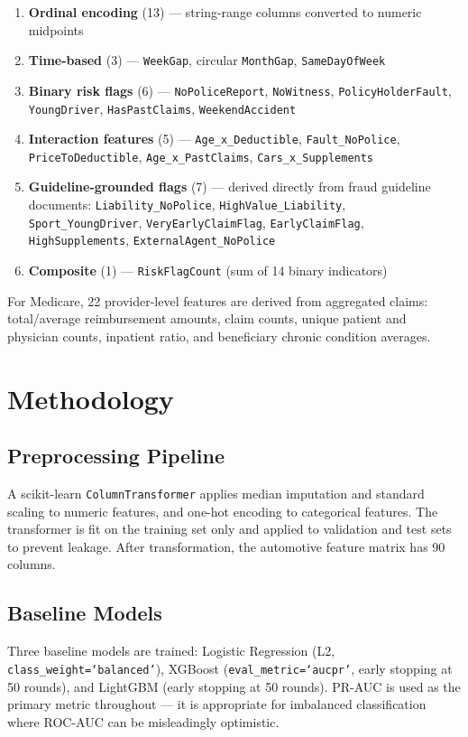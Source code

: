 \documentclass[10pt,twocolumn]{article}
\begin{document}
\begin{enumerate}[leftmargin=*, itemsep=1pt]
    \item \textbf{Ordinal encoding} (13) --- string-range columns converted to numeric midpoints
    \item \textbf{Time-based} (3) --- \texttt{WeekGap}, circular \texttt{MonthGap}, \texttt{SameDayOfWeek}
    \item \textbf{Binary risk flags} (6) --- \texttt{NoPoliceReport}, \texttt{NoWitness}, \texttt{PolicyHolderFault}, \texttt{YoungDriver}, \texttt{HasPastClaims}, \texttt{WeekendAccident}
    \item \textbf{Interaction features} (5) --- \texttt{Age\_x\_Deductible}, \texttt{Fault\_NoPolice}, \texttt{PriceToDeductible}, \texttt{Age\_x\_PastClaims}, \texttt{Cars\_x\_Supplements}
    \item \textbf{Guideline-grounded flags} (7) --- derived directly from fraud guideline documents: \texttt{Liability\_NoPolice}, \texttt{HighValue\_Liability}, \texttt{Sport\_YoungDriver}, \texttt{VeryEarlyClaimFlag}, \texttt{EarlyClaimFlag}, \texttt{HighSupplements}, \texttt{ExternalAgent\_NoPolice}
    \item \textbf{Composite} (1) --- \texttt{RiskFlagCount} (sum of 14 binary indicators)
\end{enumerate}

For Medicare, 22 provider-level features are derived from aggregated claims: total/average reimbursement amounts, claim counts, unique patient and physician counts, inpatient ratio, and beneficiary chronic condition averages.

\section{Methodology}

\subsection{Preprocessing Pipeline}
A scikit-learn \texttt{ColumnTransformer} applies median imputation and standard scaling to numeric features, and one-hot encoding to categorical features. The transformer is fit on the training set only and applied to validation and test sets to prevent leakage. After transformation, the automotive feature matrix has 90 columns.

\subsection{Baseline Models}
Three baseline models are trained: Logistic Regression (L2, \texttt{class\_weight=`balanced'}), XGBoost (\texttt{eval\_metric=`aucpr'}, early stopping at 50 rounds), and LightGBM (early stopping at 50 rounds). PR-AUC is used as the primary metric throughout --- it is appropriate for imbalanced classification where ROC-AUC can be misleadingly optimistic.
\end{document}
